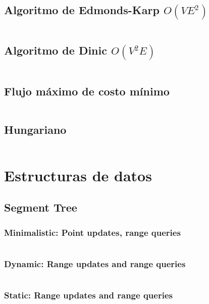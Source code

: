 \documentclass[11pt]{article}
\begin{document}
		\subsection{Algoritmo de Edmonds-Karp $O(VE^2)$}
		\inputminted[tabsize=2,breaklines,firstline=82,lastline=108,fontsize=\small]{c++}{flow.cpp}
		
		\subsection{Algoritmo de Dinic $O(V^2E)$}
		\inputminted[tabsize=2,breaklines,firstline=40,lastline=80,fontsize=\small]{c++}{flow.cpp}
		
		\subsection{Flujo máximo de costo mínimo}
		\inputminted[tabsize=2,breaklines,firstline=110,lastline=145,fontsize=\small]{c++}{flow.cpp}
		
		\subsection{Hungariano}
		\inputminted[tabsize=2,breaklines,firstline=148,lastline=202,fontsize=\small]{c++}{flow.cpp}
		
	\newpage
	\section{Estructuras de datos}
		\subsection{Segment Tree}
			\subsubsection{Minimalistic: Point updates, range queries}
			\inputminted[tabsize=2,breaklines,firstline=4,lastline=47,fontsize=\small]{c++}{queries.cpp}
			
			\subsubsection{Dynamic: Range updates and range queries}
			\inputminted[tabsize=2,breaklines,firstline=49,lastline=100,fontsize=\small]{c++}{queries.cpp}
			
			\subsubsection{Static: Range updates and range queries}
			\inputminted[tabsize=2,breaklines,firstline=102,lastline=171,fontsize=\small]{c++}{queries.cpp}
			
\end{document}
